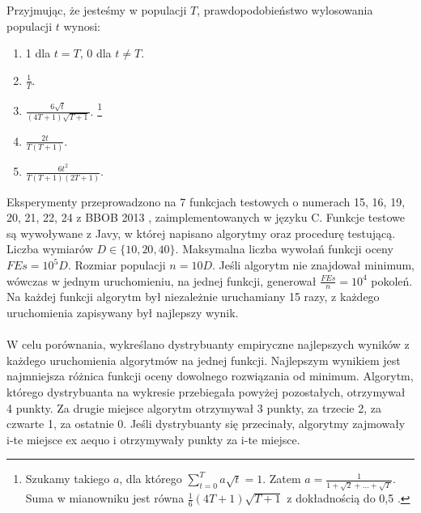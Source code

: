 \documentclass[12pt, a4paper]{article}
\begin{document}
Przyjmując, że jesteśmy w populacji $T$, prawdopodobieństwo wylosowania populacji $t$ wynosi:
\begin{enumerate}
 \item 1 dla $t=T$, 0 dla $t \neq T$.
 \item $\frac{1}{T}$.
 \item $\frac{6\sqrt{t}}{(4T+1)\sqrt{T+1}}$.
\footnote{Szukamy takiego $a$, dla którego $\sum\limits_{t=0}^T a\sqrt{t} = 1$. Zatem $a = \frac{1}{1 + \sqrt{2} + \dots + \sqrt{T}}$. 
Suma w mianowniku jest równa $\frac{1}{6}(4T+1)\sqrt{T+1}$ z dokładnością do 0,5 \cite{snehal}.}
 \item $\frac{2t}{T(T+1)}$.
 \item $\frac{6t^2}{T(T+1)(2T+1)}$.
\end{enumerate}

Eksperymenty przeprowadzono na 7 funkcjach testowych o numerach 15, 16, 19, 20, 21, 22, 24 z BBOB 2013 \cite{finck, hansen}, 
zaimplementowanych w języku C.
Funkcje testowe są wywoływane z Javy, w której napisano algorytmy oraz procedurę testującą.
Liczba wymiarów $D \in \{10, 20, 40\}$. Maksymalna liczba wywołań funkcji oceny $FEs = 10^5D$. 
Rozmiar populacji $n = 10D$. Jeśli algorytm nie znajdował minimum, wówczas w jednym uruchomieniu, na jednej funkcji, 
generował $\frac{FEs}{n} = 10^4$ pokoleń. 
Na każdej funkcji algorytm był niezależnie uruchamiany 15 razy, z każdego uruchomienia zapisywany był najlepszy wynik. \\
\\
W celu porównania, wykreślano dystrybuanty empiryczne najlepszych wyników z każdego uruchomienia 
algorytmów na jednej funkcji. Najlepszym wynikiem jest najmniejsza różnica funkcji oceny dowolnego rozwiązania od minimum.
Algorytm, którego dystrybuanta na wykresie przebiegała powyżej pozostałych, otrzymywał 4 punkty. 
Za drugie miejsce algorytm otrzymywał 3 punkty, za trzecie 2, za czwarte 1, za ostatnie 0. 
Jeśli dystrybuanty się przecinały, algorytmy zajmowały i-te miejsce ex aequo i otrzymywały punkty za i-te miejsce.

\nocite{*}


\end{document}

